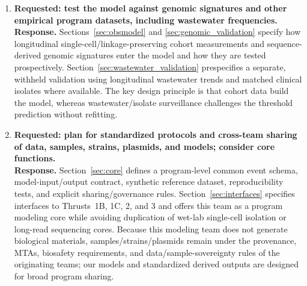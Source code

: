 \documentclass[12pt,a4paper]{article}
\begin{document}
\begin{enumerate}
\item \textbf{Requested: test the model against genomic signatures and other empirical program datasets, including wastewater frequencies.}\\
\textbf{Response.} Sections~\ref{sec:obsmodel} and \ref{sec:genomic_validation} specify how longitudinal single-cell/linkage-preserving cohort measurements and sequence-derived genomic signatures enter the model and how they are tested prospectively. Section~\ref{sec:wastewater_validation} prespecifies a separate, withheld validation using longitudinal wastewater trends and matched clinical isolates where available. The key design principle is that cohort data build the model, whereas wastewater/isolate surveillance challenges the threshold prediction without refitting.

\item \textbf{Requested: plan for standardized protocols and cross-team sharing of data, samples, strains, plasmids, and models; consider core functions.}\\
\textbf{Response.} Section~\ref{sec:core} defines a program-level common event schema, model-input/output contract, synthetic reference dataset, reproducibility tests, and explicit sharing/governance rules. Section~\ref{sec:interfaces} specifies interfaces to Thrusts~1B, 1C, 2, and 3 and offers this team as a program modeling core while avoiding duplication of wet-lab single-cell isolation or long-read sequencing cores. Because this modeling team does not generate biological materials, samples/strains/plasmids remain under the provenance, MTAs, biosafety requirements, and data/sample-sovereignty rules of the originating teams; our models and standardized derived outputs are designed for broad program sharing.
\end{enumerate}

\newpage
\small


\end{document}
